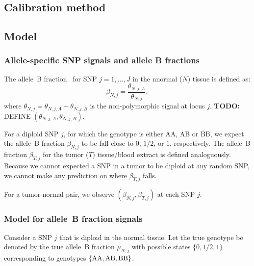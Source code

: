 \documentclass[]{bioinfo}
\newcommand{\gAA}{\textnormal{AA}\xspace}
\newcommand{\gAB}{\textnormal{AB}\xspace}
\newcommand{\gBB}{\textnormal{BB}\xspace}
\newenvironment{TODO}{\color{red}\textbf{TODO:}}{}
\begin{document}
\begin{methods}
\section{Calibration method}

\subsection{Model}
\label{Model}

\subsubsection{Allele-specific SNP signals and allele B fractions}
The allele~B fraction~\cite{PeifferD_etal_2006} for SNP $j=1,\ldots,J$ in the nnormal ($N$) tissue is defined as:
\begin{equation}
  \beta_{N,j} = \frac{\theta_{N,j,A}}{\theta_{N,j}},
  \label{eqnCnLogRatio}
\end{equation}
where $\theta_{N,j} = \theta_{N,j,A} + \theta_{N,j,B}$ is the non-polymorphic signal at locus $j$.
\begin{TODO}
  DEFINE $(\theta_{N,j,A}, \theta_{N,j,B})$.
\end{TODO}

For a diploid SNP $j$, for which the genotype is either AA, AB or BB, we expect the allele~B fraction $\beta_{N,j}$ to be fall close to $0$, $1/2$, or $1$, respectively.
The allele~B fraction $\beta_{T,j}$ for the tumor ($T$) tissue/blood extract is defined analoguously. Because we cannot expected a SNP in a tumor to be diploid at any random SNP, we cannot make any prediction on where $\beta_{T,j}$ falls.

For a tumor-normal pair, we observe $(\beta_{N,j}, \beta_{T,j})$ at each SNP $j$.

\subsubsection{Model for allele~B fraction signals}
Consider a SNP $j$ that is diploid in the normal tissue.  
Let the true genotype be denoted by the true allele~B fraction $\mu_{N,j}$ with possible states $\{0,1/2,1\}$ corresponding to genotypes $\{\gAA,\gAB,\gBB\}$.


\end{methods}
\end{document}
